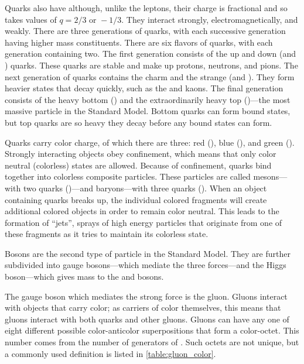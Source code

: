 Quarks also have \spinhalf although, unlike the leptons, their charge is
fractional and so takes values of $q = 2/3 \text{ or } -1/3$. They interact
strongly, electromagnetically, and weakly. There are three generations of
quarks, with each successive generation having higher mass constituents. There
are six flavors of quarks, with each generation containing two. The first
generation consists of the up and down (\upquark and \downquark) quarks. These
quarks are stable and make up protons, neutrons, and pions. The next generation
of quarks contains the charm and the strange (\charmquark and \strangequark).
They form heavier states that decay quickly, such as the \jpsi and kaons. The
final generation consists of the heavy bottom (\bottomquark) and the
extraordinarily heavy top (\topquark)---the most massive particle in the
Standard Model. Bottom quarks can form bound states, but top quarks are so
heavy they decay before any bound states can form.

Quarks carry color charge, of which there are three: red (\red), blue (\blue),
and green (\green). Strongly interacting objects obey confinement, which means
that only color neutral (colorless) states are allowed. Because of confinement,
quarks bind together into colorless composite particles. These particles are
called mesons---with two quarks (\qqbar)---and baryons---with three quarks
(\baryon). When an object containing quarks breaks up, the individual colored
fragments will create additional colored objects in order to remain color
neutral. This leads to the formation of ``jets'', sprays of high energy
particles that originate from one of these fragments as it tries to maintain
its colorless state.

Bosons are the second type of particle in the Standard Model. They are further
subdivided into gauge bosons---which mediate the three forces---and the Higgs
boson---which gives mass to the \W and \Z bosons.

The gauge boson which mediates the strong force is the gluon. Gluons interact
with objects that carry color; as carriers of color themselves, this means that
gluons interact with both quarks and other gluons. Gluons can have any one of
eight different possible color-anticolor superpositions that form a
color-octet. This number comes from the number of generators of \SUthree. Such
octets are not unique, but a commonly used definition is listed in
\cref{table:gluon_color}.




